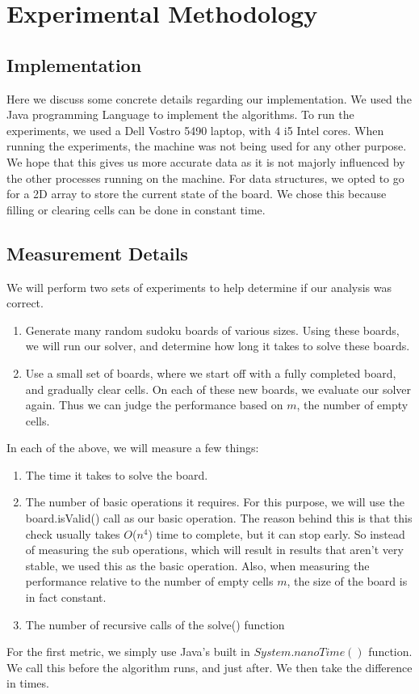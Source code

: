 \documentclass[16pt]{article}
\begin{document}
\section{Experimental Methodology}
\subsection{Implementation}
Here we discuss some concrete details regarding our implementation.
We used the Java programming Language to implement the algorithms. 
To run the experiments, we used a Dell Vostro 5490 laptop, with 4 i5 Intel cores.
When running the experiments, the machine was not being used for any other purpose. We hope that this gives us more accurate data as it is not majorly influenced by the other processes running on the machine.
\newline
\newline
For data structures, we opted to go for a 2D array to store the current state of the board. We chose this because filling or clearing cells can be done in constant time.
\subsection{Measurement Details}
We will perform two sets of experiments to help determine if our analysis was correct.
\begin{enumerate}
    \item Generate many random sudoku boards of various sizes. Using these boards, we will run our solver, and determine how long it takes to solve these boards.
    \item Use a small set of boards, where we start off with a fully completed board, and gradually clear cells.
     On each of these new boards, we evaluate our solver again. 
     Thus we can judge the performance based on $m$, the number of empty cells. 
\end{enumerate}
In each of the above, we will measure a few things:

\begin{enumerate}
    \item The time it takes to solve the board.
    \item The number of basic operations it requires. 
    For this purpose, we will use the board.isValid() call 
    as our basic operation. 
    The reason behind this is that this check usually takes 
    $O$($n^4$) time to complete, but it can stop early. So instead of measuring the sub operations, which will result in results that aren't very stable, we used this as the basic operation.
    Also, when measuring the performance relative to the number of empty cells $m$, the size of the board is in fact constant.
    \item The number of recursive calls of the solve() function
\end{enumerate}
For the first metric, we simply use Java's built in $System.nanoTime()$ function. We call this before the algorithm runs, and just after. We then take the difference in times.
\end{document}
